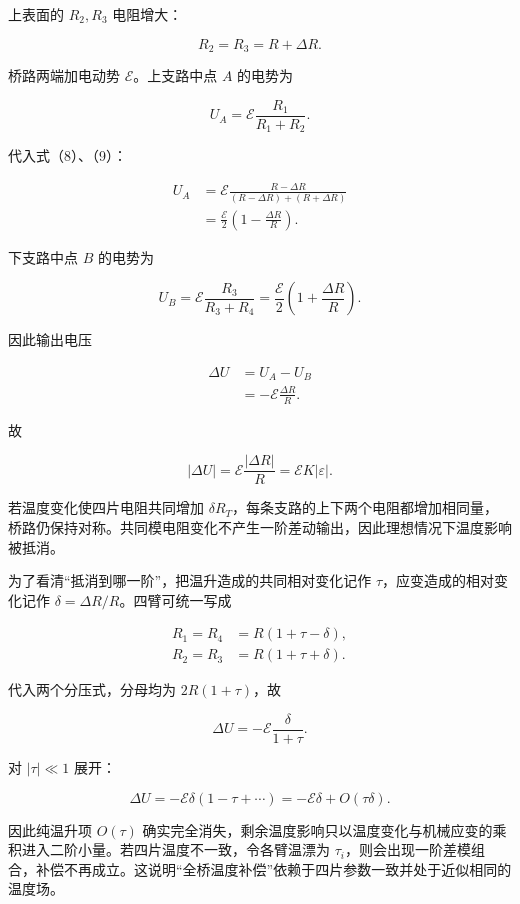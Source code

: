 \documentclass[12pt,a4paper,UTF8]{ctexart}
\begin{document}
上表面的 \(R_2,R_3\) 电阻增大：

\[
R_2=R_3=R+\Delta R.
\tag{9}
\]

桥路两端加电动势 \(\mathcal E\)。上支路中点 \(A\) 的电势为

\[
U_A=\mathcal E\frac{R_1}{R_1+R_2}.
\tag{10}
\]

代入式（8）、（9）：

\[
\begin{aligned}
U_A
&=\mathcal E\frac{R-\Delta R}{(R-\Delta R)+(R+\Delta R)}\\
&=\frac{\mathcal E}{2}\left(1-\frac{\Delta R}{R}\right).
\end{aligned}
\tag{11}
\]

下支路中点 \(B\) 的电势为

\[
U_B=\mathcal E\frac{R_3}{R_3+R_4}
=\frac{\mathcal E}{2}\left(1+\frac{\Delta R}{R}\right).
\tag{12}
\]

因此输出电压

\[
\begin{aligned}
\Delta U
&=U_A-U_B\\
&=-\mathcal E\frac{\Delta R}{R}.
\end{aligned}
\tag{13}
\]

故

\[
\boxed{
|\Delta U|=\mathcal E\frac{|\Delta R|}{R}
=\mathcal E K|\varepsilon|
}.
\tag{14}
\]

若温度变化使四片电阻共同增加
\(\delta R_T\)，每条支路的上下两个电阻都增加相同量，桥路仍保持对称。共同模电阻变化不产生一阶差动输出，因此理想情况下温度影响被抵消。

为了看清``抵消到哪一阶''，把温升造成的共同相对变化记作
\(\tau\)，应变造成的相对变化记作 \(\delta=\Delta R/R\)。四臂可统一写成

\[
\begin{aligned}
R_1=R_4&=R(1+\tau-\delta),\\
R_2=R_3&=R(1+\tau+\delta).
\end{aligned}
\tag{14a}
\]

代入两个分压式，分母均为 \(2R(1+\tau)\)，故

\[
\Delta U
=-\mathcal E\frac{\delta}{1+\tau}.
\tag{14b}
\]

对 \(|\tau|\ll1\) 展开：

\[
\Delta U
=-\mathcal E\delta(1-\tau+\cdots)
=-\mathcal E\delta+O(\tau\delta).
\tag{14c}
\]

因此纯温升项 \(O(\tau)\)
确实完全消失，剩余温度影响只以温度变化与机械应变的乘积进入二阶小量。若四片温度不一致，令各臂温漂为
\(\tau_i\)，则会出现一阶差模组合，补偿不再成立。这说明``全桥温度补偿''依赖于四片参数一致并处于近似相同的温度场。
\end{document}
